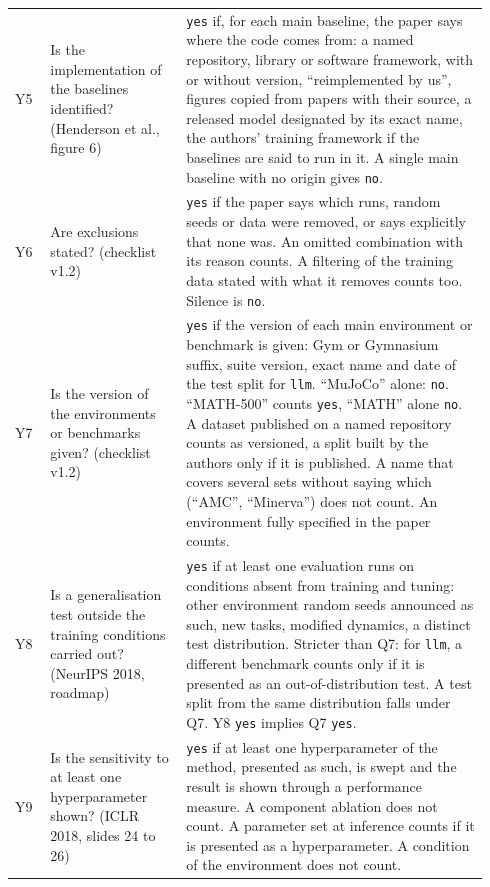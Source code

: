 \begin{small}
\begin{longtable}{@{}p{0.07\linewidth}>{\raggedright\arraybackslash}p{0.27\linewidth}>{\raggedright\arraybackslash}p{0.6\linewidth}@{}}
Y5 & Is the implementation of the baselines identified? (Henderson et al., figure 6) & \texttt{yes}
  if, for each main baseline, the paper says where the code comes from: a named repository, library
  or software framework, with or without version, \enquote{reimplemented by us}, figures copied from
  papers with their source, a released model designated by its exact name, the authors' training
  framework if the baselines are said to run in it. A single main baseline
  with no origin gives \texttt{no}. \\
Y6 & Are exclusions stated? (checklist v1.2) & \texttt{yes} if the paper says which runs, random
  seeds or data were removed, or says explicitly that none was. An omitted combination with its
  reason counts. A filtering of the training data stated with what it removes counts
  too. Silence is \texttt{no}. \\
Y7 & Is the version of the environments or benchmarks given? (checklist v1.2) & \texttt{yes} if the
  version of each main environment or benchmark is given: Gym or Gymnasium suffix, suite version,
  exact name and date of the test split for \texttt{llm}. \enquote{MuJoCo} alone: \texttt{no}.
  \enquote{MATH-500} counts \texttt{yes}, \enquote{MATH} alone \texttt{no}. A dataset published on a
  named repository counts as versioned, a split built by the authors only if it is published. A name that covers several sets without saying which (\enquote{AMC},
  \enquote{Minerva}) does not count. An environment fully specified in the paper counts. \\
Y8 & Is a generalisation test outside the training conditions carried out? (NeurIPS 2018, roadmap)
  & \texttt{yes} if at least one evaluation runs on conditions absent from training and tuning: other
  environment random seeds announced as such, new tasks, modified dynamics, a distinct test
  distribution. Stricter than Q7: for \texttt{llm}, a different benchmark counts only if it is
  presented as an out-of-distribution test. A test split from the same distribution falls under Q7.
  Y8 \texttt{yes} implies Q7 \texttt{yes}. \\
Y9 & Is the sensitivity to at least one hyperparameter shown? (ICLR 2018, slides 24 to 26) &
  \texttt{yes} if at least one hyperparameter of the method, presented as such, is swept and the
  result is shown through a performance measure. A component ablation does not count. A parameter
  set at inference counts if it is presented as a hyperparameter. A condition of the environment does
  not count. \\

\end{longtable}
\end{small}
